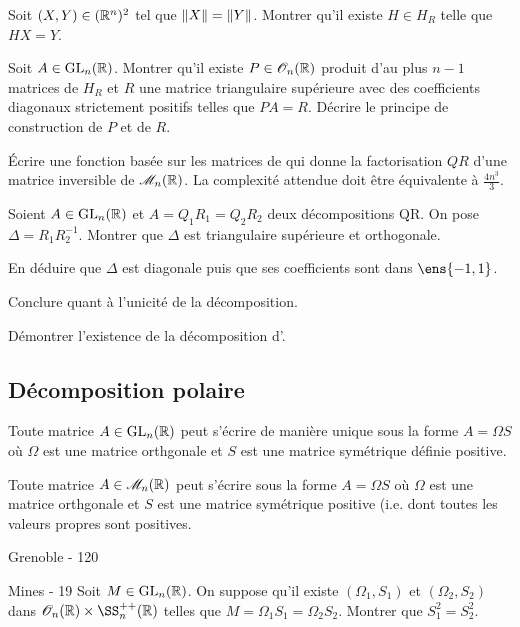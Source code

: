 Soit $(X, Y) \in (\mathbb{R}^n)^2$ tel que $\Vert X \Vert = \Vert Y \Vert$. Montrer qu'il existe $H \in H_R$ telle que $H X = Y$.

Soit $A \in \mathrm{GL}_n(\mathbb{R})$. Montrer qu'il existe $P \in \mathscr{O}_n(\mathbb{R})$ produit d'au plus $n-1$ matrices de $H_R$ et $R$ une matrice triangulaire supérieure avec des coefficients diagonaux strictement positifs telles que $P A = R$. Décrire le principe de construction de $P$ et de $R$.

Écrire une fonction basée sur les matrices de \cite{Householder} qui donne la factorisation $Q R$ d'une matrice inversible de $\mathscr{M}_n(\mathbb{R})$. La complexité attendue doit être équivalente à $\frac{4 n^3}{3}$.

Soient $A \in \mathrm{GL}_n(\mathbb{R})$ et $A = Q_1 R_1 = Q_2 R_2$ deux décompositions QR. On pose $\Delta = R_1 R_2^{-1}$.
Montrer que $\Delta$ est triangulaire supérieure et orthogonale.

En déduire que $\Delta$ est diagonale puis que ses coefficients sont dans $\ens{-1, 1}$.

Conclure quant à l'unicité de la décomposition.

Démontrer l'existence de la décomposition d'\cite{Iwasawa}.

\subsection{Décomposition polaire}

\begin{theo}
Toute matrice $A \in \mathrm{GL}_n(\mathbb{R})$ peut s'écrire de manière unique sous la forme $A = \Omega S$ où $\Omega$ est une matrice orthgonale et $S$ est une matrice symétrique définie positive.
\end{theo}

\begin{proposition}
Toute matrice $A \in \mathscr{M}_n(\mathbb{R})$ peut s'écrire sous la forme $A = \Omega S$ où $\Omega$ est une matrice orthgonale et $S$ est une matrice symétrique positive (i.e. dont toutes les valeurs propres sont positives.
\end{proposition}


{Grenoble - 120}%



Mines - 19%
Soit $M \in \mathrm{GL}_n(\mathbb{R})$. On suppose qu'il existe $(\Omega_1, S_1)$ et $(\Omega_2, S_2)$ dans $\mathscr{O}_n(\R) \times \SS_n^{++}(\R)$ telles que $M = \Omega_1 S_1 = \Omega_2 S_2$.
Montrer que $S_1^2 = S_2^2$.

